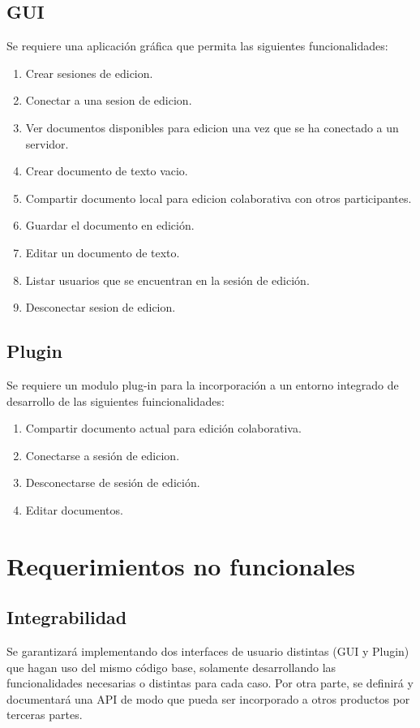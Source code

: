 \documentclass[12pt,a4paper]{article}
\begin{document}
	\subsection{GUI} 
	Se requiere una aplicación gráfica que permita las siguientes funcionalidades:
	\begin{enumerate}
	\item Crear sesiones de edicion.
	\item Conectar a una sesion de edicion.
	\item Ver documentos disponibles para edicion una vez que se ha conectado a un servidor.
	\item Crear documento de texto vacio.
	\item Compartir documento local para edicion colaborativa con otros participantes.
	\item Guardar el documento en edición.
	\item Editar un documento de texto.
	\item Listar usuarios que se encuentran en la sesión de edición.
	\item Desconectar sesion de edicion.
	\end{enumerate}


\subsection{Plugin}
Se requiere un modulo plug-in para la incorporación a un entorno integrado de desarrollo de las siguientes fuincionalidades:
	\begin{enumerate}
	\item Compartir documento actual para edición colaborativa.
	\item Conectarse a sesión de edicion.
	\item Desconectarse de sesión de edición.
	\item Editar documentos.
	\end{enumerate}
	\section{Requerimientos no funcionales}


\subsection{Integrabilidad} Se garantizará implementando dos interfaces de usuario distintas (GUI y Plugin) que hagan uso del mismo código base, solamente desarrollando las funcionalidades necesarias o distintas para cada caso.
Por otra parte, se definirá y documentará una API de modo que pueda ser incorporado a otros productos por terceras partes.
\end{document}
